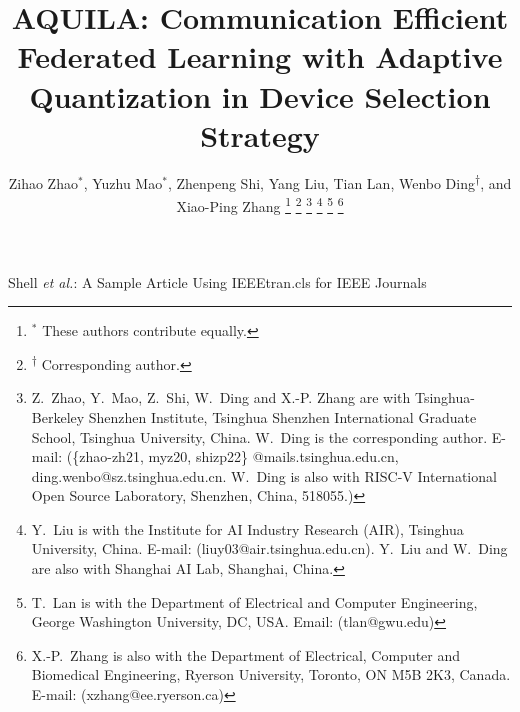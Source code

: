 \documentclass[lettersize,journal]{IEEEtran}
\begin{document}
\sloppy

\title{AQUILA: Communication Efficient Federated Learning with Adaptive Quantization in Device Selection Strategy}

\author{Zihao Zhao$^{*}$,
        Yuzhu Mao$^{*}$,
        Zhenpeng Shi,
        Yang Liu,
        Tian Lan,
        Wenbo Ding\textsuperscript{$\dag$}, and
        Xiao-Ping Zhang
\thanks{$^{*}$ These authors contribute equally.}
\thanks{\textsuperscript{$\dag$} Corresponding author.}
\thanks{Z.~Zhao, Y.~Mao, Z.~Shi, W.~Ding and X.-P. Zhang are with Tsinghua-Berkeley Shenzhen Institute, Tsinghua Shenzhen International Graduate School, Tsinghua University, China. W.~Ding is the corresponding author. E-mail: (\{zhao-zh21, myz20, shizp22\} @mails.tsinghua.edu.cn, ding.wenbo@sz.tsinghua.edu.cn. W.~Ding is also with RISC-V International Open Source Laboratory, Shenzhen, China, 518055.)}%
\thanks{Y.~Liu is with the Institute for AI Industry Research (AIR), Tsinghua University, China. E-mail: (liuy03@air.tsinghua.edu.cn). Y.~Liu and W.~Ding are also with Shanghai AI Lab, Shanghai, China.}
\thanks{T.~Lan is with the Department of Electrical and Computer Engineering, George Washington University, DC, USA. Email: (tlan@gwu.edu)}
\thanks{X.-P.~Zhang is also with the Department of Electrical, Computer and Biomedical Engineering, Ryerson University, Toronto, ON M5B 2K3, Canada. E-mail: (xzhang@ee.ryerson.ca)}
}

%
{Shell \MakeLowercase{\textit{et al.}}: A Sample Article Using IEEEtran.cls for IEEE Journals}


\maketitle
\end{document}
